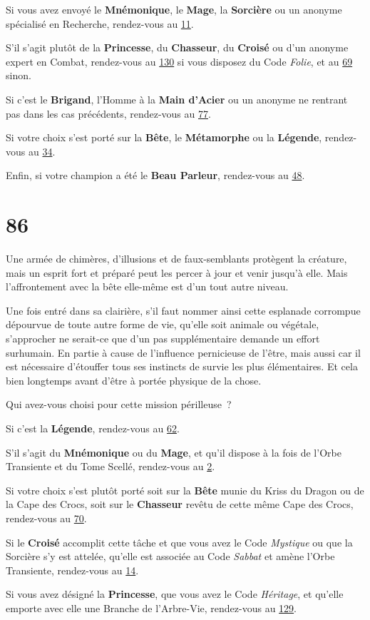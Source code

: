 \documentclass{report}
\newcommand{\gsection}[1]{
    \section{#1}
    \label{section-#1}
}
\newcommand{\glink}[1]{\hyperref[section-#1]{#1}}
\newcommand{\hero}[1]{\textbf{#1}}
\begin{document}
Si vous avez envoyé le \hero{Mnémonique}, le \hero{Mage}, la \hero{Sorcière} ou un anonyme spécialisé en Recherche, rendez-vous au \glink{11}.

S'il s'agit plutôt de la \hero{Princesse}, du \hero{Chasseur}, du \hero{Croisé} ou d'un anonyme expert en Combat, rendez-vous au \glink{130} si vous disposez du Code \emph{Folie}, et au \glink{69} sinon.

Si c'est le \hero{Brigand}, l'Homme à la \hero{Main d'Acier} ou un anonyme ne rentrant pas dans les cas précédents, rendez-vous au \glink{77}.

Si votre choix s'est porté sur la \hero{Bête}, le \hero{Métamorphe} ou la \hero{Légende}, rendez-vous au \glink{34}.

Enfin, si votre champion a été le \hero{Beau Parleur}, rendez-vous au \glink{48}.

\gsection{86}

Une armée de chimères, d'illusions et de faux-semblants protègent la créature, mais un esprit fort et préparé peut les percer à jour et venir jusqu'à elle. Mais l'affrontement avec la bête elle-même est d'un tout autre niveau.

Une fois entré dans sa clairière, s'il faut nommer ainsi cette esplanade corrompue dépourvue de toute autre forme de vie, qu'elle soit animale ou végétale, s'approcher ne serait-ce que d'un pas supplémentaire demande un effort surhumain. En partie à cause de l'influence pernicieuse de l'être, mais aussi car il est nécessaire d'étouffer tous ses instincts de survie les plus élémentaires. Et cela bien longtemps avant d'être à portée physique de la chose.

Qui avez-vous choisi pour cette mission périlleuse ?

Si c'est la \hero{Légende}, rendez-vous au \glink{62}.

S'il s'agit du \hero{Mnémonique} ou du \hero{Mage}, et qu'il dispose à la fois de l'Orbe Transiente et du Tome Scellé, rendez-vous au \glink{2}.

Si votre choix s'est plutôt porté soit sur la \hero{Bête} munie du Kriss du Dragon ou de la Cape des Crocs, soit sur le \hero{Chasseur} revêtu de cette même Cape des Crocs, rendez-vous au \glink{70}.

Si le \hero{Croisé} accomplit cette tâche et que vous avez le Code \emph{Mystique} ou que la Sorcière s'y est attelée, qu'elle est associée au Code \emph{Sabbat} et amène l'Orbe Transiente, rendez-vous au \glink{14}.

Si vous avez désigné la \hero{Princesse}, que vous avez le Code \emph{Héritage}, et qu'elle emporte avec elle une Branche de l'Arbre-Vie, rendez-vous au \glink{129}.
\end{document}
